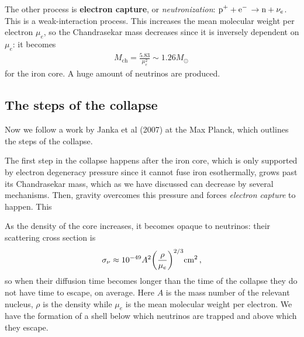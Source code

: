 \documentclass[main.tex]{subfiles}
\begin{document}
The other process is \textbf{electron capture}, or \emph{neutronization}: \(\ce{p+ + e- \rightarrow n +} \nu_{e}\).
This is a weak-interaction process.
This increases the mean molecular weight per electron \(\mu_{e}\), so the Chandrasekar mass decreases since it is inversely dependent on \(\mu_{e}\): it becomes
%
\begin{align}
M _{\text{ch}} = \frac{5.83}{\mu_{e}^2} \sim 1.26 M_{\odot}
\,
\end{align}
%
for the iron core.
A huge amount of neutrinos are produced. 


\subsection{The steps of the collapse}

Now we follow a work by Janka et al (2007) at the Max Planck, which outlines the steps of the collapse. 

The first step in the collapse happens after the iron core, which is only supported by electron degeneracy pressure since it cannot fuse iron esothermally, grows past its Chandrasekar mass, which as we have discussed can decrease by several mechanisms. Then, gravity overcomes this pressure and forces \emph{electron capture} to happen. This 

As the density of the core increases, it becomes opaque to neutrinos: their scattering cross section is
%
\begin{align}
  \sigma_{\nu } \approx \num{e-49} A^2 \qty(\frac{\rho }{\mu_{e}})^{2/3} \SI{}{cm^2}
\,,
\end{align}
%
so when their diffusion time becomes longer than the time of the collapse they do not have time to escape, on average.
Here \(A\) is the mass number of the relevant nucleus, \(\rho \) is the density while \(\mu_{e}\) is the mean molecular weight per electron.
We have the formation of a shell below which neutrinos are trapped and above which they escape.

\end{document}
